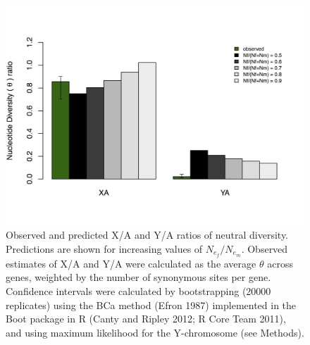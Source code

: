 \documentclass[9pt,twocolumn,twoside]{gsajnl}
\begin{document}
\begin{figure}[htbp]
\centering
\noindent
\includegraphics[width=\linewidth]{figure2.jpg}
\caption{Observed and predicted X/A and Y/A ratios of neutral diversity. Predictions are shown for increasing values of $N_{e}_{f}/N_{e}_{m}$. Observed estimates of X/A and Y/A were calculated as the average $\theta$ across genes, weighted by the number of synonymous sites per gene. Confidence intervals were calculated by bootstrapping (20000 replicates) using the BCa method (Efron 1987) implemented in the Boot package in R (Canty and Ripley 2012; R Core Team 2011), and using maximum likelihood for the Y-chromosome (see Methods).
}
\label{fig:spectrum}
\end{figure}
\end{document}
